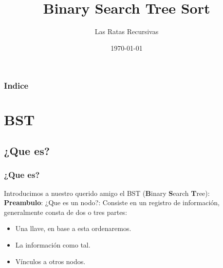 \documentclass{beamer}
\title[BSTSort]{Binary Search Tree Sort} %
\author{Las Ratas Recursivas} %
\institute[UTEM] %
{
Universidad Tecnológica Metropolitana \\ %
\medskip
\url{https://github.com/RatasRecursivas} %
}
\date{\today} %
\begin{document}

\begin{frame}
	\titlepage %
\end{frame}

\begin{frame}
	\frametitle{Indice} %
	\tableofcontents %
\end{frame}


\section{BST} %

	\subsection{¿Que es?} %

		\begin{frame}
			\frametitle{¿Que es?}
				Introducimos a nuestro querido amigo el BST (\textbf{B}inary \textbf{S}earch \textbf{T}ree):\\
			\textbf{Preambulo}: ¿Que es un nodo?: Consiste en un registro de información, generalmente consta de dos o tres partes:
			\begin{itemize}[<+->]
				\item Una llave, en base a esta ordenaremos.
				\item La información como tal.
				\item Vínculos a otros nodos.
			\end{itemize}
		\end{frame}
\end{document}
